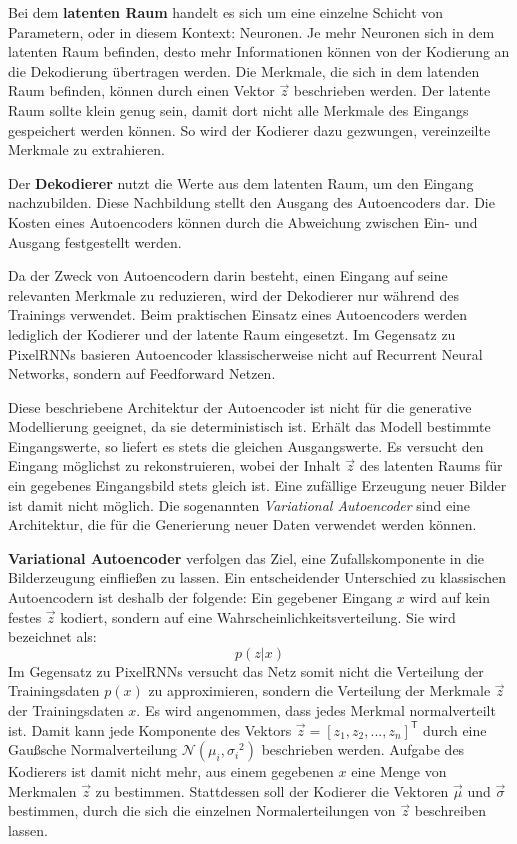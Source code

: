 Bei dem \textbf{latenten Raum} handelt es sich um eine einzelne Schicht von Parametern, oder in diesem Kontext: Neuronen. Je mehr Neuronen sich in dem latenten Raum befinden, desto mehr Informationen können von der Kodierung an die Dekodierung übertragen werden. Die Merkmale, die sich in dem latenden Raum befinden, können durch einen Vektor $\vec{z}$ beschrieben werden. Der latente Raum sollte klein genug sein, damit dort nicht alle Merkmale des Eingangs gespeichert werden können. So wird der Kodierer dazu gezwungen, vereinzeilte Merkmale zu extrahieren. 

Der \textbf{Dekodierer} nutzt die Werte aus dem latenten Raum, um den Eingang nachzubilden. Diese Nachbildung stellt den Ausgang des Autoencoders dar. Die Kosten eines Autoencoders können durch die Abweichung zwischen Ein- und Ausgang festgestellt werden. 

Da der Zweck von Autoencodern darin besteht, einen Eingang auf seine relevanten Merkmale zu reduzieren, wird der Dekodierer nur während des Trainings verwendet. Beim praktischen Einsatz eines Autoencoders werden lediglich der Kodierer und der latente Raum eingesetzt. Im Gegensatz zu \acp{PixelRNN} basieren Autoencoder klassischerweise nicht auf Recurrent Neural Networks, sondern auf Feedforward Netzen.

Diese beschriebene Architektur der Autoencoder ist nicht für die generative Modellierung geeignet, da sie deterministisch ist. Erhält das Modell bestimmte Eingangswerte, so liefert es stets die gleichen Ausgangswerte. Es versucht den Eingang möglichst zu rekonstruieren, wobei der Inhalt $\vec{z}$ des latenten Raums für ein gegebenes Eingangsbild stets gleich ist. Eine zufällige Erzeugung neuer Bilder ist damit nicht möglich. Die sogenannten \emph{Variational Autoencoder} sind eine Architektur, die für die Generierung neuer Daten verwendet werden können. \cite{visualApproach}

\textbf{Variational Autoencoder} verfolgen das Ziel, eine Zufallskomponente in die Bilderzeugung einfließen zu lassen. Ein entscheidender Unterschied zu klassischen Autoencodern ist deshalb der folgende: Ein gegebener Eingang $x$ wird auf kein festes $\vec{z}$ kodiert, sondern auf eine Wahrscheinlichkeitsverteilung. Sie wird bezeichnet als:
\begin{equation}
   p(z|x)
\end{equation}
Im Gegensatz zu \acp{PixelRNN} versucht das Netz somit nicht die Verteilung der Trainingsdaten $p(x)$ zu approximieren, sondern die Verteilung der Merkmale $\vec{z}$ der Trainingsdaten $x$.
Es wird angenommen, dass jedes Merkmal normalverteilt ist. Damit kann jede Komponente des Vektors $\vec{z} = [z_{1}, z_{2}, ..., z_{n}]^\mathsf{T}$ durch eine Gaußsche Normalverteilung $\mathcal{N}(\mu_{i}, {\sigma_{i}}^{2})$ beschrieben werden. Aufgabe des Kodierers ist damit nicht mehr, aus einem gegebenen $x$ eine Menge von Merkmalen $\vec{z}$ zu bestimmen. Stattdessen soll der Kodierer die Vektoren $\vec{\mu}$ und $\vec{\sigma}$ bestimmen, durch die sich die einzelnen Normalerteilungen von $\vec{z}$ beschreiben lassen. 

